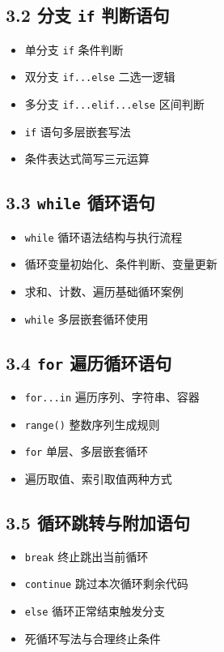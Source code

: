 \subsection{3.2 分支 \texttt{if} 判断语句}
\begin{itemize}
\item 单分支 \texttt{if} 条件判断
\item 双分支 \texttt{if...else} 二选一逻辑
\item 多分支 \texttt{if...elif...else} 区间判断
\item \texttt{if} 语句多层嵌套写法
\item 条件表达式简写三元运算
\end{itemize}

\subsection{3.3 \texttt{while} 循环语句}
\begin{itemize}
\item \texttt{while} 循环语法结构与执行流程
\item 循环变量初始化、条件判断、变量更新
\item 求和、计数、遍历基础循环案例
\item \texttt{while} 多层嵌套循环使用
\end{itemize}

\subsection{3.4 \texttt{for} 遍历循环语句}
\begin{itemize}
\item \texttt{for...in} 遍历序列、字符串、容器
\item \texttt{range()} 整数序列生成规则
\item \texttt{for} 单层、多层嵌套循环
\item 遍历取值、索引取值两种方式
\end{itemize}

\subsection{3.5 循环跳转与附加语句}
\begin{itemize}
\item \texttt{break} 终止跳出当前循环
\item \texttt{continue} 跳过本次循环剩余代码
\item \texttt{else} 循环正常结束触发分支
\item 死循环写法与合理终止条件
\end{itemize}

